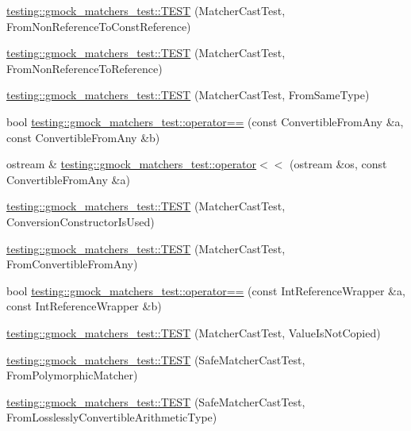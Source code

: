 \begin{DoxyCompactItemize}
\hyperlink{namespacetesting_1_1gmock__matchers__test_a6fd48b8275f96d9d4ee840f0ec590fb1}{testing\+::gmock\+\_\+matchers\+\_\+test\+::\+T\+E\+ST} (Matcher\+Cast\+Test, From\+Non\+Reference\+To\+Const\+Reference)
\item 
\hyperlink{namespacetesting_1_1gmock__matchers__test_ab8d3174b8f1ab799906938ed9984643b}{testing\+::gmock\+\_\+matchers\+\_\+test\+::\+T\+E\+ST} (Matcher\+Cast\+Test, From\+Non\+Reference\+To\+Reference)
\item 
\hyperlink{namespacetesting_1_1gmock__matchers__test_a8f845dd5b1bcdc660926d67dce32b5d2}{testing\+::gmock\+\_\+matchers\+\_\+test\+::\+T\+E\+ST} (Matcher\+Cast\+Test, From\+Same\+Type)
\item 
bool \hyperlink{namespacetesting_1_1gmock__matchers__test_af0b7ba716a9150ff6db37abda4b44fc8}{testing\+::gmock\+\_\+matchers\+\_\+test\+::operator==} (const Convertible\+From\+Any \&a, const Convertible\+From\+Any \&b)
\item 
ostream \& \hyperlink{namespacetesting_1_1gmock__matchers__test_a2a2abd1e49c201ae26ed96211d4225eb}{testing\+::gmock\+\_\+matchers\+\_\+test\+::operator$<$$<$} (ostream \&os, const Convertible\+From\+Any \&a)
\item 
\hyperlink{namespacetesting_1_1gmock__matchers__test_a42e4d7d26704516436281897cb41bb1b}{testing\+::gmock\+\_\+matchers\+\_\+test\+::\+T\+E\+ST} (Matcher\+Cast\+Test, Conversion\+Constructor\+Is\+Used)
\item 
\hyperlink{namespacetesting_1_1gmock__matchers__test_ae51787fccc0f0a27e3725039c6cd48dc}{testing\+::gmock\+\_\+matchers\+\_\+test\+::\+T\+E\+ST} (Matcher\+Cast\+Test, From\+Convertible\+From\+Any)
\item 
bool \hyperlink{namespacetesting_1_1gmock__matchers__test_a33c068c32bf5118e5be92771b146db77}{testing\+::gmock\+\_\+matchers\+\_\+test\+::operator==} (const Int\+Reference\+Wrapper \&a, const Int\+Reference\+Wrapper \&b)
\item 
\hyperlink{namespacetesting_1_1gmock__matchers__test_ae99c08c8a815964b61f98a4785cf79b5}{testing\+::gmock\+\_\+matchers\+\_\+test\+::\+T\+E\+ST} (Matcher\+Cast\+Test, Value\+Is\+Not\+Copied)
\item 
\hyperlink{namespacetesting_1_1gmock__matchers__test_a29c04361c022a71711dbf9d3cf2a5050}{testing\+::gmock\+\_\+matchers\+\_\+test\+::\+T\+E\+ST} (Safe\+Matcher\+Cast\+Test, From\+Polymorphic\+Matcher)
\item 
\hyperlink{namespacetesting_1_1gmock__matchers__test_a70bbe53742db988a828d9e8201e34770}{testing\+::gmock\+\_\+matchers\+\_\+test\+::\+T\+E\+ST} (Safe\+Matcher\+Cast\+Test, From\+Losslessly\+Convertible\+Arithmetic\+Type)

\end{DoxyCompactItemize}
